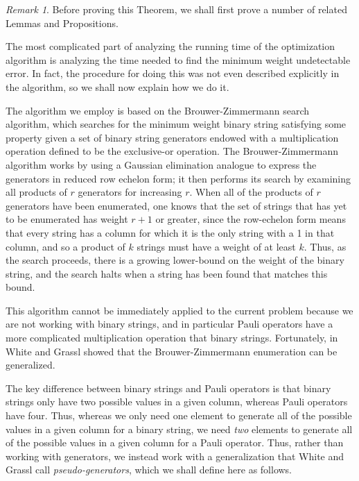 \documentclass{amsbook}
\theoremstyle{plain}
\theoremstyle{definition}
\theoremstyle{remark}
\newtheorem{remark}{Remark}
\begin{document}
\begin{remark}
Before proving this Theorem, we shall first prove a number of related Lemmas and Propositions.

The most complicated part of analyzing the running time of the optimization algorithm is analyzing the time needed to find the minimum weight undetectable error.  In fact, the procedure for doing this was not even described explicitly in the algorithm, so we shall now explain how we do it.

The algorithm we employ is based on the Brouwer-Zimmermann search algorithm, which searches for the minimum weight binary string satisfying some property given a set of binary string generators endowed with a multiplication operation defined to be the exclusive-or operation.  The Brouwer-Zimmermann algorithm works by using a Gaussian elimination analogue to express the generators in reduced row echelon form;  it then performs its search by examining all products of $r$ generators for increasing $r$.  When all of the products of $r$ generators have been enumerated, one knows that the set of strings that has yet to be enumerated has weight $r+1$ or greater, since the row-echelon form means that every string has a column for which it is the only string with a 1 in that column, and so a product of $k$ strings must have a weight of at least $k$.  Thus, as the search proceeds, there is a growing lower-bound on the weight of the binary string, and the search halts when a string has been found that matches this bound.

This algorithm cannot be immediately applied to the current problem because we are not working with binary strings, and in particular Pauli operators have a more complicated multiplication operation that binary strings.  Fortunately, in~\cite{White:2006fj} White and Grassl showed that the Brouwer-Zimmermann enumeration can be generalized.

The key difference between binary strings and Pauli operators is that binary strings only have two possible values in a given column, whereas Pauli operators have four.  Thus, whereas we only need one element to generate all of the possible values in a given column for a binary string, we need \emph{two} elements to generate all of the possible values in a given column for a Pauli operator.  Thus, rather than working with generators, we instead work with a generalization that White and Grassl call \emph{pseudo-generators}, which we shall define here as follows.
\end{remark}
\end{document}
